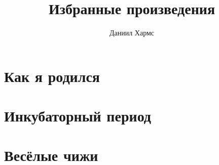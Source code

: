 \documentclass[a4paper]{article}
\title{Избранные произведения}
\author{Даниил Хармс}
\date{}
\begin{document}
\maketitle

\section{Как я родился}


\section{Инкубаторный период}


\section{Весёлые чижи}

\end{document}
